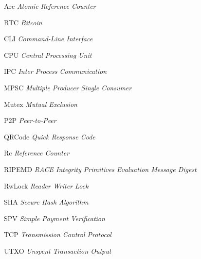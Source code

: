 \begin{siglas}
    \item[Arc] \textit{Atomic Reference Counter}
    \item[BTC] \textit{Bitcoin}
    \item[CLI] \textit{Command-Line Interface}
    \item[CPU] \textit{Central Processing Unit}
    \item[IPC] \textit{Inter Process Communication}
    \item[MPSC] \textit{Multiple Producer Single Consumer}
    \item[Mutex] \textit{Mutual Exclusion}
    \item[P2P] \textit{Peer-to-Peer}
    \item[QRCode] \textit{Quick Response Code}
    \item[Rc] \textit{Reference Counter}
    \item[RIPEMD] \textit{RACE Integrity Primitives Evaluation Message Digest}
    \item[RwLock] \textit{Reader Writer Lock}
    \item[SHA] \textit{Secure Hash Algorithm}
    \item[SPV] \textit{Simple Payment Verification}
    \item[TCP] \textit{Transmission Control Protocol}
    \item[UTXO] \textit{Unspent Transaction Output}
\end{siglas}


\tableofcontents*
\cleardoublepage
